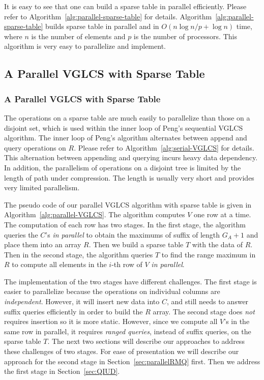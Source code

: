 It is easy to see that one can build a sparse table in parallel
efficiently.  Please refer to
Algorithm~\ref{alg:parallel-sparse-table} for details.
Algorithm~\ref{alg:parallel-sparse-table} builds sparse table in
parallel and in $O(n \log n / p + \log n)$ time, where $n$ is the
number of elements and $p$ is the number of processors.  This
algorithm is very easy to parallelize and implement.



\ifdefined\MasterThesis
\subsection{A Parallel VGLCS with Sparse Table}
\else
\subsubsection{A Parallel VGLCS with Sparse Table}
\fi

The operations on a sparse table are much easily to parallelize than
those on a disjoint set, which is used within the inner loop of Peng's
sequential VGLCS algorithm.  The inner loop of Peng's algorithm
alternates between append and query operations on $R$.  Please refer
to Algorithm~\ref{alg:serial-VGLCS} for details.  This alternation
between appending and querying incurs heavy data dependency.  In
addition, the parallelism of operations on a disjoint tree is limited
by the length of path under compression.  The length is usually very
short and provides very limited parallelism.

The pseudo code of our parallel VGLCS algorithm with sparse table is
given in Algorithm~\ref{alg:parallel-VGLCS}.  The algorithm computes
$V$ one row at a time.  The computation of each row has two stages.
In the first stage, the algorithm queries the $C$'s {\em in parallel}
to obtain the maximums of suffix of length $G_A + 1$ and place them
into an array $R$.  Then we build a sparse table $T$ with the data of
$R$.  Then in the second stage, the algorithm queries $T$ to find the
range maximum in $R$ to compute all elements in the $i$-th row of $V$
{\em in parallel}.



The implementation of the two stages have different challenges.  The
first stage is easier to parallelize because the operations on
individual columns are {\em independent}.  However, it will insert new
data into $C$, and still needs to answer suffix queries efficiently in
order to build the $R$ array.  The second stage does {\em not}
requires insertion so it is more static.  However, since we compute
all $V$'s in the same row in parallel, it requires {\em ranged
  queries}, instead of suffix queries, on the sparse table $T$.  The
next two sections will describe our approaches to address these
challenges of two stages.  For ease of presentation we will describe
our approach for the second stage in Section~\ref{sec:parallelRMQ}
first.  Then we address the first stage in Section~\ref{sec:QIUD}.
